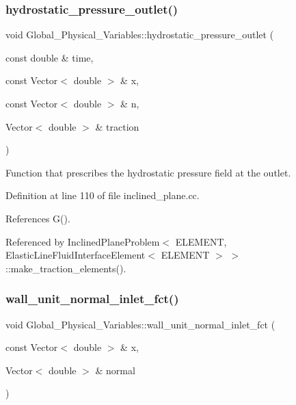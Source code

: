 \subsubsection{\texorpdfstring{hydrostatic\+\_\+pressure\+\_\+outlet()}{hydrostatic\_pressure\_outlet()}}
{\footnotesize\ttfamily void Global\+\_\+\+Physical\+\_\+\+Variables\+::hydrostatic\+\_\+pressure\+\_\+outlet (\begin{DoxyParamCaption}\item[{const double \&}]{time,  }\item[{const Vector$<$ double $>$ \&}]{x,  }\item[{const Vector$<$ double $>$ \&}]{n,  }\item[{Vector$<$ double $>$ \&}]{traction }\end{DoxyParamCaption})}



Function that prescribes the hydrostatic pressure field at the outlet. 



Definition at line 110 of file inclined\+\_\+plane.\+cc.



References G().



Referenced by Inclined\+Plane\+Problem$<$ E\+L\+E\+M\+E\+N\+T, Elastic\+Line\+Fluid\+Interface\+Element$<$ E\+L\+E\+M\+E\+N\+T $>$ $>$\+::make\+\_\+traction\+\_\+elements().

\mbox{\label{namespaceGlobal__Physical__Variables_aa26e74c1f9f93f8212e45380f55fb562}} 
\subsubsection{\texorpdfstring{wall\+\_\+unit\+\_\+normal\+\_\+inlet\+\_\+fct()}{wall\_unit\_normal\_inlet\_fct()}}
{\footnotesize\ttfamily void Global\+\_\+\+Physical\+\_\+\+Variables\+::wall\+\_\+unit\+\_\+normal\+\_\+inlet\+\_\+fct (\begin{DoxyParamCaption}\item[{const Vector$<$ double $>$ \&}]{x,  }\item[{Vector$<$ double $>$ \&}]{normal }\end{DoxyParamCaption})}




